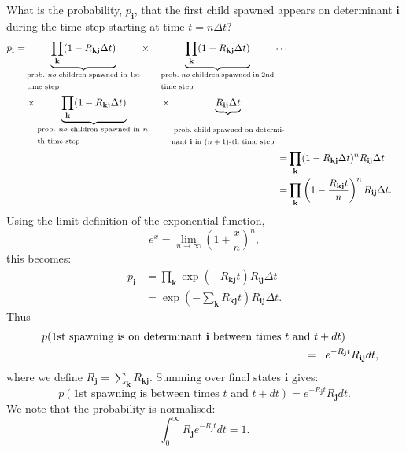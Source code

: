 \documentclass[a4paper, 11pt]{article}
\newcommand{\bi}{\mathbf{i}}
\newcommand{\bj}{\mathbf{j}}
\newcommand{\bk}{\mathbf{k}}
\begin{document}
What is the probability, $p_\bi$, that the first child spawned appears
on determinant $\bi$ during the time step starting at time $t=n\Delta t$?
\begin{align}
\begin{split}
p_\bi =& 
\underbrace{\prod_{\bk} (1-R_{\bk\bj}\Delta
  t)}_{\textrm{\parbox{4cm}{prob.\ \emph{no} children spawned in 1st
      time step}}} \times
\quad\underbrace{\prod_{\bk} (1-R_{\bk\bj}\Delta t)}_{\textrm{\parbox{4cm}{prob.\ \emph{no} children spawned in 2nd time step}}}
\cdots \\
& \times \underbrace{\prod_{\bk} (1-R_{\bk\bj}\Delta t)}_{\textrm{\parbox{4cm}{prob.\ \emph{no} children spawned in $n$-th time step}}} 
\quad\times \underbrace{R_{\bi\bj}\Delta
  t}_{\textrm{\parbox{4cm}{\rule{0mm}{5.5mm} prob.\ child spawned on determinant $\bi$ in $(n+1)$-th time step}}}
\end{split} \\
\hphantom{p}=& \prod_{\bk} (1-R_{\bk\bj}\Delta t)^n R_{\bi\bj}\Delta t \\
\hphantom{p}=& \prod_{\bk} 
\left(1-\frac{R_{\bk\bj}t}{n}\right)^n R_{\bi\bj}\Delta t .
\end{align}
Using the limit definition of the exponential function, 
\begin{equation}
e^x = \lim_{n\to\infty} \left(1+\frac{x}{n}\right)^n,
\end{equation}
this becomes:
\begin{align}
p_\bi &= \prod_{\bk} \exp\left(-R_{\bk\bj}t\right) R_{\bi\bj}\Delta t \\
  &= \exp\left(-\sum_\bk R_{\bk\bj}t\right)  R_{\bi\bj}\Delta t.
\end{align}
Thus
\begin{eqnarray}
& & p(\textrm{1st spawning is on determinant $\bi$ between times $t$ and
 $t+dt$}) \hspace*{3em} \\\nonumber
&& \quad = \;\; e^{-R_{\bj}t} R_{\bi\bj} dt,
\end{eqnarray}
where we define $R_\bj=\sum_\bk R_{\bk\bj}$. Summing over final states
$\bi$ gives:
\begin{equation}
p(\textrm{1st spawning is between times $t$ and $t+dt$}) = e^{-R_\bj t} R_\bj dt.
\end{equation}
We note that the probability is normalised:
\begin{equation}
\int_0^\infty R_\bj e^{-R_\bj t} dt = 1.
\end{equation}
\end{document}
